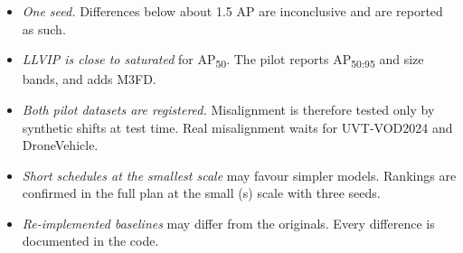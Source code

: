 \documentclass[11pt,a4paper]{article}
\begin{document}
\begin{itemize}
  \item \emph{One seed.} Differences below about 1.5 AP are inconclusive and are
        reported as such.
  \item \emph{LLVIP is close to saturated} for AP\textsubscript{50}. The pilot
        reports AP\textsubscript{50:95} and size bands, and adds M3FD.
  \item \emph{Both pilot datasets are registered.} Misalignment is therefore tested
        only by synthetic shifts at test time. Real misalignment waits for
        UVT-VOD2024 and DroneVehicle.
  \item \emph{Short schedules at the smallest scale} may favour simpler models.
        Rankings are confirmed in the full plan at the small (s) scale with three
        seeds.
  \item \emph{Re-implemented baselines} may differ from the originals. Every
        difference is documented in the code.
\end{itemize}


\end{document}
